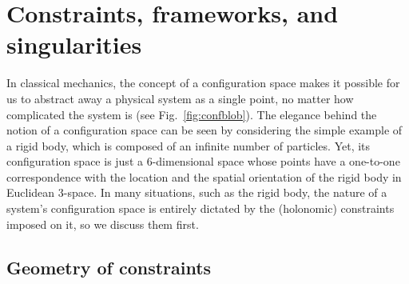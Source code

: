 
\chapter[Constraints, frameworks, and singularities]{Constraints, frameworks, and singularities}
  \label{chap02}


In classical mechanics, the concept of a configuration space makes it possible for us to abstract away a physical system as a single point, no matter how complicated the system is (see Fig.~\ref{fig:confblob}).
The elegance behind the notion of a configuration space can be seen by considering the simple example of a rigid body, which is composed of an infinite number of particles.
Yet, its configuration space is just a 6-dimensional space whose points have a one-to-one correspondence with the location and the spatial orientation of the rigid body in Euclidean 3-space.
In many situations, such as the rigid body, the nature of a system's configuration space is entirely dictated by the (holonomic) constraints imposed on it, so we discuss them first.

\section{Geometry of constraints}
\label{sec:constraints}

